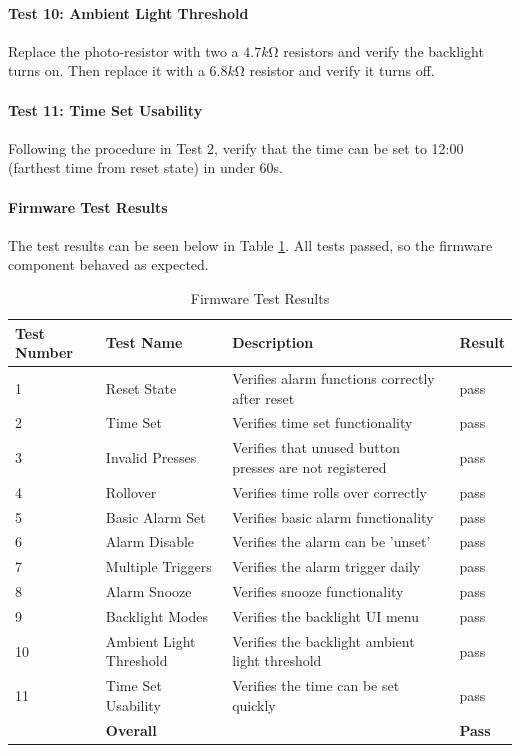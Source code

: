 \documentclass{article}
\begin{document}
\paragraph{Test 10: Ambient Light Threshold} Replace the photo-resistor with two a $4.7\si{k\ohm}$ resistors and verify the backlight turns on. Then replace it with a $6.8\si{k\ohm}$ resistor and verify it turns off.

\paragraph{Test 11: Time Set Usability} Following the procedure in Test 2, verify that the time can be set to 12:00 (farthest time from reset state) in under 60s.

\paragraph{Firmware Test Results}
The test results can be seen below in Table \ref{tab:fw_test}. All tests passed, so the firmware component behaved as expected.
\begin{table}[H]
    \centering
    \begin{tabular}{l|l|l|l}
        Test Number & Test Name & Description & Result \\ \hline
        1&Reset State           & Verifies alarm  functions correctly after reset& pass\\
        2&Time Set              & Verifies time set functionality & pass\\
        3&Invalid Presses       & Verifies that unused button presses are not registered & pass\\
        4&Rollover              & Verifies time rolls over correctly & pass\\
        5&Basic Alarm Set       & Verifies basic alarm functionality & pass\\
        6&Alarm Disable         & Verifies the alarm can be 'unset'& pass\\
        7&Multiple Triggers     & Verifies the alarm trigger daily& pass\\
        8&Alarm Snooze          & Verifies snooze functionality& pass\\
        9&Backlight Modes       & Verifies the backlight UI menu& pass\\
        10&Ambient Light Threshold & Verifies the backlight ambient light threshold& pass\\
        11&Time Set Usability   & Verifies the time can be set quickly& pass\\
        \hline
        &\textbf{Overall} && \textbf{Pass}\\
    \end{tabular}
    \caption{Firmware Test Results}
    \label{tab:fw_test}
\end{table}
\end{document}
